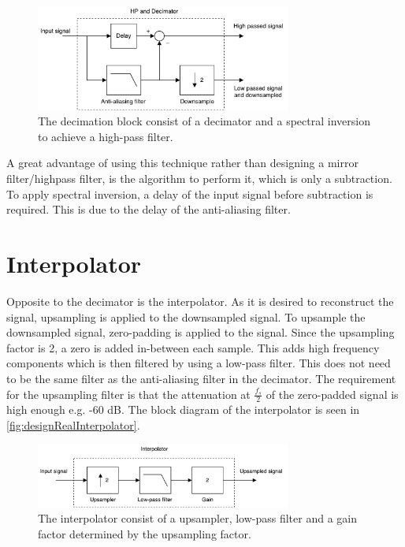 \begin{figure}[H]
\centering
\includegraphics[width=0.75\textwidth]{figures/designRealDecimator.pdf}
\caption{The decimation block consist of a decimator and a spectral inversion to achieve a high-pass filter.}
\label{fig:designRealDecimator}
\end{figure}

A great advantage of using this technique rather than designing a mirror filter/highpass filter, is the algorithm to perform it, which is only a subtraction. To apply spectral inversion, a delay of the input signal before subtraction is required. This is due to the delay of the anti-aliasing filter.


\section{Interpolator}

Opposite to the decimator is the interpolator. As it is desired to reconstruct the signal, upsampling is applied to the downsampled signal. To upsample the downsampled signal, zero-padding is applied to the signal. Since the upsampling factor is 2, a zero is added in-between each sample. This adds high frequency components which is then filtered by using a low-pass filter. This does not need to be the same filter as the anti-aliasing filter in the decimator. The requirement for the upsampling filter is that the attenuation at $\frac{f_s}{2}$ of the zero-padded signal is high enough e.g. -60 dB. The block diagram of the interpolator is seen in \autoref{fig:designRealInterpolator}.

\begin{figure}[H]
\centering
\includegraphics[width=0.75\textwidth]{figures/designRealInterpolator.pdf}
\caption{The interpolator consist of a upsampler, low-pass filter and a gain factor determined by the upsampling factor.}
\label{fig:designRealInterpolator}
\end{figure}

